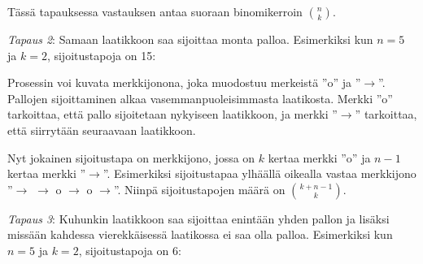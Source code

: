 Tässä tapauksessa vastauksen antaa suoraan binomikerroin ${n \choose k}$.

\textit{Tapaus 2}: Samaan laatikkoon saa sijoittaa
monta palloa.
Esimerkiksi kun $n=5$ ja $k=2$, sijoitustapoja on 15:

\begin{center}
\end{center}

Prosessin voi kuvata merkkijonona, joka muodostuu
merkeistä ''o'' ja ''$\rightarrow$''.
Pallojen sijoittaminen alkaa
vasemmanpuoleisimmasta laatikosta.
Merkki ''o'' tarkoittaa, että pallo sijoitetaan
nykyiseen laatikkoon, ja merkki
''$\rightarrow$'' tarkoittaa, että siirrytään
seuraavaan laatikkoon.

Nyt jokainen sijoitustapa on merkkijono, jossa
on $k$ kertaa merkki ''o'' ja $n-1$ kertaa
merkki ''$\rightarrow$''.
Esimerkiksi sijoitustapaa
ylhäällä oikealla
vastaa merkkijono ''$\rightarrow$ $\rightarrow$ o $\rightarrow$ o $\rightarrow$''.
Niinpä sijoitustapojen määrä on ${k+n-1 \choose k}$.

\textit{Tapaus 3}: Kuhunkin laatikkoon saa sijoittaa
enintään yhden pallon ja lisäksi missään kahdessa
vierekkäisessä laatikossa ei saa olla palloa.
Esimerkiksi kun $n=5$ ja $k=2$, sijoitustapoja on 6:


